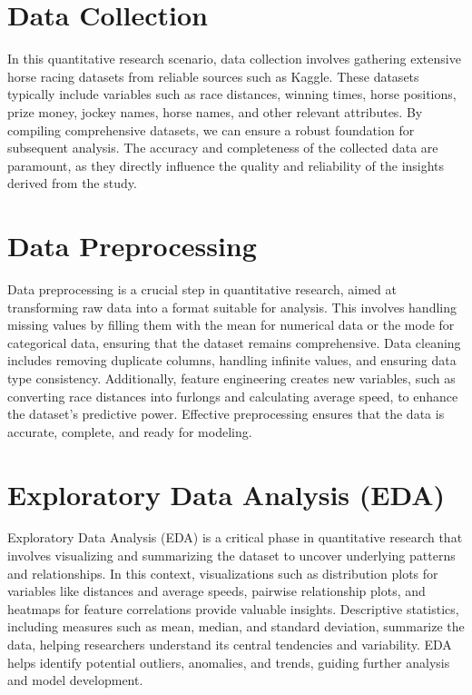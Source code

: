 \documentclass{article}
\begin{document}
\section*{Data Collection}
In this quantitative research scenario, data collection involves gathering extensive horse racing datasets from reliable sources such as Kaggle. These datasets typically include variables such as race distances, winning times, horse positions, prize money, jockey names, horse names, and other relevant attributes. By compiling comprehensive datasets, we can ensure a robust foundation for subsequent analysis. The accuracy and completeness of the collected data are paramount, as they directly influence the quality and reliability of the insights derived from the study.

\section*{Data Preprocessing}
Data preprocessing is a crucial step in quantitative research, aimed at transforming raw data into a format suitable for analysis. This involves handling missing values by filling them with the mean for numerical data or the mode for categorical data, ensuring that the dataset remains comprehensive. Data cleaning includes removing duplicate columns, handling infinite values, and ensuring data type consistency. Additionally, feature engineering creates new variables, such as converting race distances into furlongs and calculating average speed, to enhance the dataset's predictive power. Effective preprocessing ensures that the data is accurate, complete, and ready for modeling.

\section*{Exploratory Data Analysis (EDA)}
Exploratory Data Analysis (EDA) is a critical phase in quantitative research that involves visualizing and summarizing the dataset to uncover underlying patterns and relationships. In this context, visualizations such as distribution plots for variables like distances and average speeds, pairwise relationship plots, and heatmaps for feature correlations provide valuable insights. Descriptive statistics, including measures such as mean, median, and standard deviation, summarize the data, helping researchers understand its central tendencies and variability. EDA helps identify potential outliers, anomalies, and trends, guiding further analysis and model development.
\end{document}
